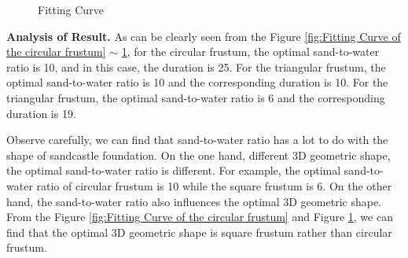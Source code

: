 \documentclass{mcmthesis}		    %
\begin{document}
    \begin{figure}[htbp!]
	\centering
	\caption{Fitting Curve}\label{fig:Fitting Curve}%
\end{figure}
   
     \textbf{Analysis of Result.} As can be clearly seen from the Figure \ref{fig:Fitting Curve of the circular frustum}  $\sim$ \ref{fig:Fitting Curve}, for the circular frustum, the  optimal sand-to-water ratio is 10, and in this case, the duration is 25. For the triangular frustum, the optimal sand-to-water ratio is 10 and the corresponding duration is 10. For the triangular frustum, the optimal sand-to-water ratio is 6 and the corresponding duration is 19.
     
     Observe carefully, we can find that sand-to-water ratio has a lot to do with the shape of sandcastle foundation. On the one hand, different 3D geometric shape, the optimal sand-to-water ratio is different. For example, the optimal sand-to-water ratio of circular frustum is 10 while the square frustum is 6. On the other hand, the sand-to-water ratio also influences the optimal 3D geometric shape. From the Figure \ref{fig:Fitting Curve of the circular frustum} and Figure \ref{fig:Fitting Curve}, we can find that the optimal 3D geometric shape is square frustum rather than circular frustum.
\end{document}
